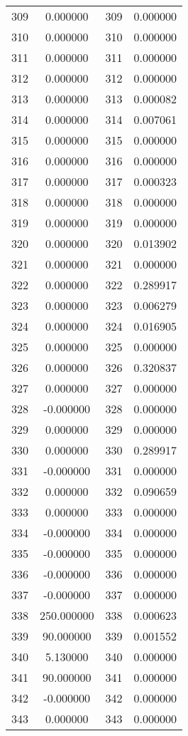 \documentclass[12pt]{article}
\begin{document}
\begin{longtable}{@{}cccc@{}}
309 & 0.000000 & 309 & 0.000000 \\
310 & 0.000000 & 310 & 0.000000 \\
311 & 0.000000 & 311 & 0.000000 \\
312 & 0.000000 & 312 & 0.000000 \\
313 & 0.000000 & 313 & 0.000082 \\
314 & 0.000000 & 314 & 0.007061 \\
315 & 0.000000 & 315 & 0.000000 \\
316 & 0.000000 & 316 & 0.000000 \\
317 & 0.000000 & 317 & 0.000323 \\
318 & 0.000000 & 318 & 0.000000 \\
319 & 0.000000 & 319 & 0.000000 \\
320 & 0.000000 & 320 & 0.013902 \\
321 & 0.000000 & 321 & 0.000000 \\
322 & 0.000000 & 322 & 0.289917 \\
323 & 0.000000 & 323 & 0.006279 \\
324 & 0.000000 & 324 & 0.016905 \\
325 & 0.000000 & 325 & 0.000000 \\
326 & 0.000000 & 326 & 0.320837 \\
327 & 0.000000 & 327 & 0.000000 \\
328 & -0.000000 & 328 & 0.000000 \\
329 & 0.000000 & 329 & 0.000000 \\
330 & 0.000000 & 330 & 0.289917 \\
331 & -0.000000 & 331 & 0.000000 \\
332 & 0.000000 & 332 & 0.090659 \\
333 & 0.000000 & 333 & 0.000000 \\
334 & -0.000000 & 334 & 0.000000 \\
335 & -0.000000 & 335 & 0.000000 \\
336 & -0.000000 & 336 & 0.000000 \\
337 & -0.000000 & 337 & 0.000000 \\
338 & 250.000000 & 338 & 0.000623 \\
339 & 90.000000 & 339 & 0.001552 \\
340 & 5.130000 & 340 & 0.000000 \\
341 & 90.000000 & 341 & 0.000000 \\
342 & -0.000000 & 342 & 0.000000 \\
343 & 0.000000 & 343 & 0.000000 \\

\end{longtable}
\end{document}
